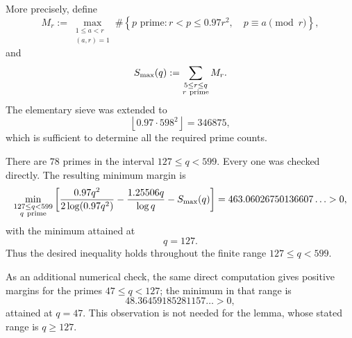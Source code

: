 \documentclass[11pt,a4paper]{article}
\theoremstyle{definition}
\theoremstyle{remark}
\begin{document}
More precisely, define
\[
M_r
:=
\max_{\substack{1\le a<r\\(a,r)=1}}
\#\left\{
p\text{ prime}:
r<p\le0.97r^2,\quad
p\equiv a\pmod r
\right\},
\]
and
\[
S_{\max}(q)
:=
\sum_{\substack{5\le r\le q\\r\ {\rm prime}}}M_r.
\]
The elementary sieve was extended to
\[
\left\lfloor0.97\cdot598^2\right\rfloor
=
346875,
\]
which is sufficient to determine all the required prime counts.

There are $78$ primes in the interval $127\le q<599$. Every one was
checked directly. The resulting minimum margin is
\[
\min_{\substack{127\le q<599\\q\ {\rm prime}}}
\left[
\frac{0.97q^2}{2\log(0.97q^2)}
-\frac{1.25506q}{\log q}
-S_{\max}(q)
\right]
=
463.06026750136607\ldots
>0,
\]
with the minimum attained at
\[
q=127.
\]
Thus the desired inequality holds throughout the finite range
$127\le q<599$.

As an additional numerical check, the same direct computation gives
positive margins for the primes $47\le q<127$; the minimum in that
range is
\[
48.36459185281157\ldots
>0,
\]
attained at $q=47$. This observation is not needed for the lemma,
whose stated range is $q\ge127$.
\end{document}
